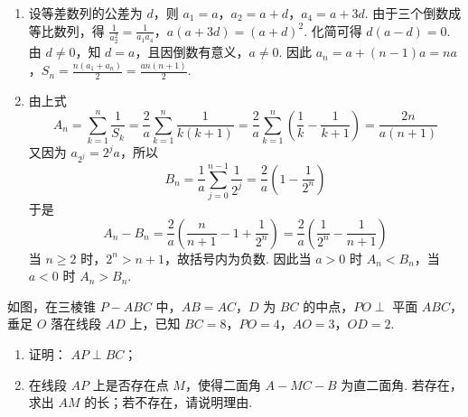 \begin{solution}
\begin{enumerate}
\item
设等差数列的公差为 \(d\)，则 \(a_1=a\)，\(a_2=a+d\)，\(a_4=a+3d\). 由于三个倒数成等比数列，得
\(\frac{1}{a_2^2}=\frac{1}{a_1a_4}\)，\(a(a+3d)=(a+d)^2\).
化简可得 \(d(a-d)=0\). 由 \(d\neq0\)，知 \(d=a\)，且因倒数有意义，\(a\neq0\). 因此
\(a_n=a+(n-1)a=na\)，\(S_n=\frac{n(a_1+a_n)}{2}=\frac{an(n+1)}{2}\).

\item
由上式
\[
A_n=\sum_{k=1}^{n}\frac{1}{S_k}=\frac{2}{a}\sum_{k=1}^{n}\frac{1}{k(k+1)}=\frac{2}{a}\sum_{k=1}^{n}\left(\frac{1}{k}-\frac{1}{k+1}\right)=\frac{2n}{a(n+1)}
\]
又因为 \(a_{2^j}=2^ja\)，所以
\[
B_n=\frac{1}{a}\sum_{j=0}^{n-1}\frac{1}{2^j}=\frac{2}{a}\left(1-\frac{1}{2^n}\right)
\]
于是
\[
A_n-B_n=\frac{2}{a}\left(\frac{n}{n+1}-1+\frac{1}{2^n}\right)=\frac{2}{a}\left(\frac{1}{2^n}-\frac{1}{n+1}\right)
\]
当 \(n\geqslant2\) 时，\(2^n>n+1\)，故括号内为负数. 因此当 \(a>0\) 时 \(A_n<B_n\)，当 \(a<0\) 时 \(A_n>B_n\).
\end{enumerate}
\end{solution}

\begin{problem}
如图，在三棱锥 \(P - ABC\) 中，\(AB = AC\)，\(D\) 为 \(BC\) 的中点，\(PO \perp\) 平面 \(ABC\)，垂足 \(O\) 落在线段 \(AD\) 上，已知 \(BC = 8\)，\(PO = 4\)，\(AO = 3\)，\(OD = 2\).
\begin{enumerate}
\item 证明： \(AP \perp BC\)；
\item 在线段 \(AP\) 上是否存在点 \(M\)，使得二面角 \(A - MC - B\) 为直二面角. 若存在，求出 \(AM\) 的长；若不存在，请说明理由.
\end{enumerate}

\end{problem}

